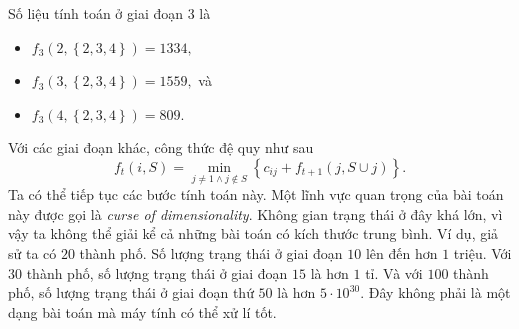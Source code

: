 \documentclass[12pt,a4paper]{article}
\begin{document}
Số liệu tính toán ở giai đoạn 3 là
\begin{itemize}
\item \({f_3}\left( {2,\left\{ {2,3,4} \right\}} \right) = 1334,\)
\item \({f_3}\left( {3,\left\{ {2,3,4} \right\}} \right) = 1559,\) và
\item \({f_3}\left( {4,\left\{ {2,3,4} \right\}} \right) = 809.\)
\end{itemize}
Với các giai đoạn khác, công thức đệ quy như sau
\[{f_t}\left( {i,S} \right) = \mathop {\min }\limits_{j \ne 1 \wedge j \notin S} \left\{ {{c_{ij}} + {f_{t + 1}}\left( {j,S \cup j} \right)} \right\}.\]
Ta có thể tiếp tục các bước tính toán này. Một lĩnh vực quan trọng của bài toán này được gọi là \textit{curse of dimensionality}. Không gian trạng thái ở đây khá lớn, vì vậy ta không thể giải kể cả những bài toán có kích thước trung bình. Ví dụ, giả sử ta có \(20\) thành phố. Số lượng trạng thái ở giai đoạn \(10\) lên đến hơn \(1\) triệu. Với \(30\) thành phố, số lượng trạng thái ở giai đoạn \(15\) là hơn \(1\) tỉ. Và với \(100\) thành phố, số lượng trạng thái ở giai đoạn thứ \(50\) là hơn \(5 \cdot {10^{30}}.\) Đây không phải là một dạng bài toán mà máy tính có thể xử lí tốt.
\end{document}

